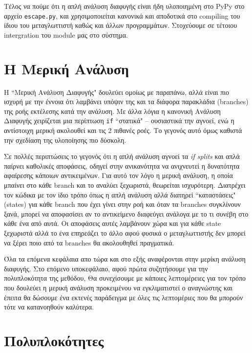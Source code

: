 Τέλος να πούμε ότι η απλή ανάλυση διαφυγής είναι ήδη υλοποιημένη στο PyPy στο
αρχείο \texttt{escape.py}, και χρησιμοποιείται κανονικά και αποδοτικά στο
compiling του ίδιου του μεταγλωττιστή καθώς και άλλων προγραμμάτων. Στοχεύουμε
σε τέτοιου intergration του module μας στο σύστημα.


\section{Η Μερική Ανάλυση}

Η ``Μερική Ανάλυση Διαφυγής" δουλεύει ομοίως με παραπάνω, αλλά είναι πιο ισχυρή
με την έννοια ότι λαμβάνει υπόψιν της και τα διάφορα παρακλάδια (branches) της
ροής εκτέλεσης κατά την ανάλυση. Με άλλα λόγια η κανονική Ανάλυση Διαφυγής
χειρίζεται μια περίπτωση \texttt{if} ``στατικά" – ουσιαστικά την αγνοεί, ενώ η
αντίστοιχη μερική ακολουθεί και τις 2 πιθανές ροές. Το γεγονός αυτό όμως
καθιστά την σχεδίαση της υλοποίησης πιο δύσκολη.

Σε πολλές περιπτώσεις το γεγονός ότι η απλή ανάλυση αγνοεί τα \textit{if splits}
και απλά παίρνει καθολικές αποφάσεις, οδηγεί στην ανικανότητα να ανιχνευτεί η
δυνατότητα αφαίρεσης κάποιων αντικειμένων. Για αυτό τον λόγο η μερική ανάλυση, η
οποία μπαίνει στο κάθε branch και το αναλύει ξεχωριστά, θεωρείται ισχυρότερη.
Διατρέχει τον κώδικα με τον ίδιο τρόπο όπως η απλή ανάλυση αλλά διατηρεί
``καταστάσεις" (states) για κάθε branch που έχει γίνει στην ροή και όταν τα
branches συγκλίνουν ξανά, μπορεί να αποφασίσει αν το αντικείμενο διαφεύγει
ανάλογα με το τι συνέβη στο κάθε ένα από αυτά. Οι αποφάσεις αυτές λαμβάνουν χώρα
και για κάθε state ξεχωριστά αλλά το ένα επηρεάζει το άλλο αφού φυσικά ο
μεταγλωττιστής δεν μπορεί να ξέρει ποιο από τα branches θα ακολουθηθεί
πραγματικά.

Όλα τα επόμενα κεφάλαια απο τώρα και στο εξής αναφέρονται στην μερίκη ανάλυση
διαφυγής. Στο επόμενο υποκεφάλαιο, αφού πρώτα συζητήσουμε για την πολυπλοκότητα
της μεθόδου, Θα συνεχίσουμε με κάποιες λεπτομέρειες για τον τρόπο που δουλεύει η
μερική ανάλυση προκειμένου να εγκλιματιστεί ο αναγνώστης και έπειτα θα δώσουμε
ένα εκτενές παράδειγμα με όλες τις λεπτομέριες που θα μπορούν τότε να
κατανοηθούν καλύτερα.

\section{Πολυπλοκότητες}

